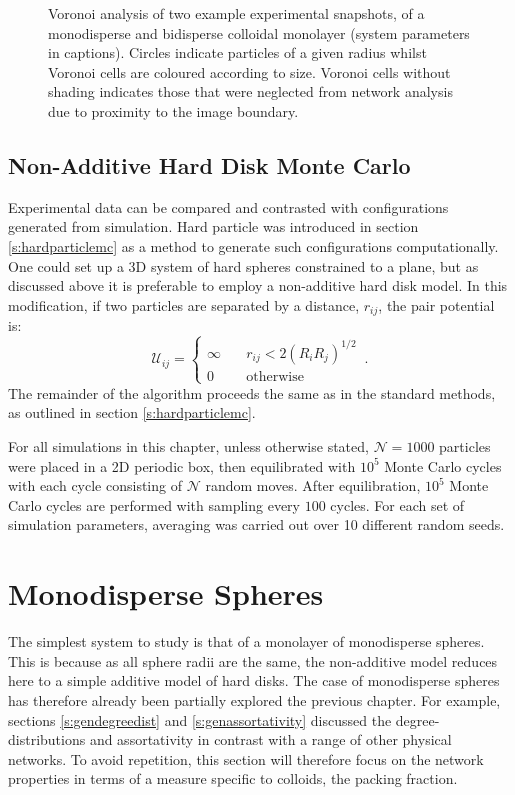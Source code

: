 \begin{figure}[bt]
     \caption{Voronoi analysis of two example experimental snapshots, of a monodisperse and bidisperse \qtd{} colloidal monolayer (system parameters in captions). Circles indicate particles of a given radius whilst Voronoi cells are coloured according to size. Voronoi cells without shading indicates those that were neglected from network analysis due to proximity to the image boundary.}
     \label{fig:expvoro}
\end{figure}

\subsection{Non\--Additive Hard Disk Monte Carlo}
\label{s:nonaddmc}

Experimental data can be compared and contrasted with configurations generated from simulation.
Hard particle \mc{} was introduced in section \ref{s:hardparticlemc} as a method to generate such configurations computationally.
One could set up a 3D system of hard spheres constrained to a plane, but as discussed above it is preferable to employ a non\--additive hard disk model.
In this modification, if two particles are separated by a distance, $r_{ij}$, the pair potential is:
\begin{equation}
	\mathcal{U}_{ij} = \begin{cases} \infty \quad &r_{ij}<2\left(R_iR_j\right)^{1/2} \\ 0 \quad &\text{otherwise} \end{cases}\,.
\end{equation}
The remainder of the algorithm proceeds the same as in the standard methods, as outlined in section \ref{s:hardparticlemc}.

For all simulations in this chapter, unless otherwise stated, $\mathcal{N}=1000$ particles were placed in a 2D periodic box, then equilibrated with $10^5$ Monte Carlo cycles with each cycle consisting of $\mathcal{N}$ random moves.
After equilibration, $10^5$ Monte Carlo cycles are performed with sampling every $100$ cycles.
For each set of simulation parameters, averaging was carried out over 10 different random seeds.


\section{Monodisperse Spheres}
\label{s:monodisperse}

The simplest \qtd{} system to study is that of a monolayer of monodisperse spheres.
This is because as all sphere radii are the same, the non\--additive model reduces here to a simple additive model of hard disks.
The case of monodisperse spheres has therefore already been partially explored the previous chapter.
For example, sections \ref{s:gendegreedist} and \ref{s:genassortativity} discussed the degree\--distributions and assortativity in contrast with a range of other physical networks.
To avoid repetition, this section will therefore focus on the network properties in terms of a measure specific to colloids, the packing fraction.

